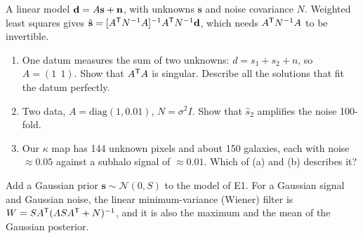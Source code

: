 
\begin{given}
A linear model $\mathbf{d} = A\mathbf{s} + \mathbf n$, with unknowns $\mathbf s$ and noise covariance $N$. Weighted least squares
gives $\hat{\mathbf s} = [A^{\mathsf{T}} N^{-1}A]^{-1}A^{\mathsf{T}} N^{-1}\mathbf{d}$, which needs $A^{\mathsf{T}} N^{-1}A$ to be invertible.
\end{given}


\begin{enumerate}
  \item One datum measures the sum of two unknowns: $d = s_1 + s_2 + n$, so $A = (1\ \ 1)$. Show that $A^{\mathsf{T}} A$ is
    singular. Describe all the solutions that fit the datum perfectly.
  \item Two data, $A = \mathrm{diag}(1, 0.01)$, $N = \sigma^2 I$. Show that $\hat s_2$ amplifies the noise 100-fold.
  \item Our $\kappa$ map has 144 unknown pixels and about 150 galaxies, each with noise $\approx 0.05$ against a subhalo
    signal of $\approx 0.01$. Which of (a) and (b) describes it?
\end{enumerate}



\begin{given}
Add a Gaussian prior $\mathbf s \sim \mathcal N(0, S)$ to the model of E1. For a Gaussian signal and Gaussian noise, the
linear minimum-variance (Wiener) filter is $W = SA^{\mathsf{T}}(ASA^{\mathsf{T}} + N)^{-1}$, and it is also the maximum and the mean of the
Gaussian posterior.
\end{given}

